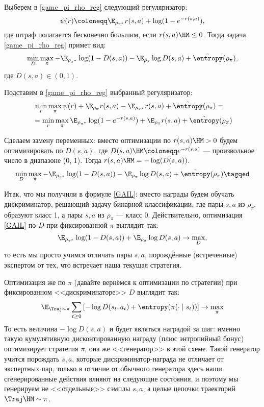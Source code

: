 \begin{theorem}
Выберем в \eqref{game_pi_rho_reg} следующий регуляризатор:
\begin{equation}\label{gail_reg}
\psi(r) \coloneqq \E_{\rho_{\pi^*}} r(s, a) + \log (1 - e^{-r(s, a)}),
\end{equation}
где штраф полагается бесконечно большим, если $r(s, a) \HM\le 0$. Тогда задача \eqref{game_pi_rho_reg} примет вид:
\begin{equation}\label{GAIL}
\min\limits_{D} \max\limits_{\pi} -\E_{\rho_{\pi^*}} \log (1 - D(s, a)) - \E_{\rho_{\pi}} \log D(s, a) + \tilde{\entropy}(\rho_\pi),
\end{equation}
где $D(s, a) \in (0, 1)$.

\beginproof
Подставим в \eqref{game_pi_rho_reg} выбранный регуляризатор:
\begin{align*}
&\, \min\limits_{r} \max\limits_{\pi} \psi(r) + \E_{\rho_\pi} r(s, a) - \E_{\rho_{\pi^*}} r(s, a) + \tilde{\entropy}(\rho_\pi) = \\
&= \min\limits_{r} \max\limits_{\pi} \E_{\rho_{\pi^*}} \log (1 - e^{-r(s, a)}) + \E_{\rho_\pi} r(s, a) + \tilde{\entropy}(\rho_\pi)
\end{align*}

Сделаем замену переменных: вместо оптимизации по $r(s, a) \HM > 0$ будем оптимизировать по $D(s, a)$, где $D(s, a) \HM \coloneqq e^{-r(s, a)}$ --- произвольное число в диапазоне (0, 1). Тогда $r(s, a) \HM= -\log(D(s, a))$.
\begin{equation*}
\min\limits_{D} \max\limits_{\pi} -\E_{\rho_{\pi^*}} \log (1 - D(s, a)) - \E_{\rho_\pi} \log D(s, a) + \tilde{\entropy}(\rho_\pi)   \tagqed
\end{equation*}
\end{theorem}

Итак, что мы получили в формуле \eqref{GAIL}: вместо награды будем обучать дискриминатор, решающий задачу бинарной классификации, где пары $s, a$ из $\rho_{\pi^*}$ образуют класс 1, а пары $s, a$ из $\rho_\pi$ --- класс 0. Действительно, оптимизация \eqref{GAIL} по $D$ при фиксированной $\pi$ выглядит так:
$$\E_{\rho_{\pi^*}} \log (1 - D(s, a)) + \E_{\rho_{\pi}} \log D(s, a) \to \max\limits_{D},$$
то есть мы просто учимся отличать пары $s, a$, порождённые (встреченные) экспертом от тех, что встречает наша текущая стратегия. 

Оптимизация же по $\pi$ (давайте вернёмся к оптимизации по стратегии) при фиксированном <<дискриминаторе>> $D$ выглядит так:
$$
\E_{\Traj \sim \pi} \sum_{t \ge 0} \left[ -\log D(s_t, a_t) + \entropy(\pi(\cdot \mid s_t)) \right] \to \max\limits_{\pi}
$$
То есть величина $-\log D(s, a)$ и будет являться наградой за шаг: именно такую кумулятивную дисконтированную награду (плюс энтропийный бонус) оптимизирует стратегия $\pi$, она же <<генератор>> в этой схеме. Такой генератор учится порождать $s, a$, которые дискриминатор-награда не отличает от экспертных пар, только в отличие от обычного генератора здесь наши сгенерированные действия влияют на следующие состояния, и поэтому мы генерируем не <<отдельные>> сэмплы $s, a$, а целые цепочки траекторий $\Traj \HM\sim \pi$. 

